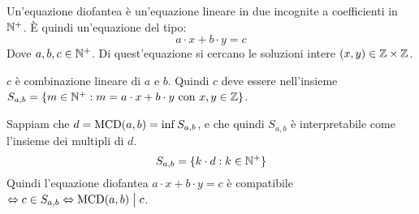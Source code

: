 \begin{defn}
Un'equazione diofantea \`e un'equazione lineare in due incognite a coefficienti in $\mathbb{N}^+$. \`E quindi un'equazione del tipo:
\[
a \cdot x + b \cdot y = c
\]
Dove $a, b, c \in \mathbb{N}^+$. Di quest'equazione si cercano le soluzioni intere $(x, y) \in \mathbb{Z} \times \mathbb{Z}$.
\end{defn}
$c$ \`e combinazione lineare di $a$ e $b$. Quindi $c$ deve essere nell'insieme $S_{a,b} = \{ m \in \mathbb{N}^+ : m = a \cdot x + b \cdot y \text{ con } x, y \in \mathbb{Z}\}$.

Sappiam che $d = \operatorname{MCD}(a,b) = \inf S_{a,b}$, e che quindi $S_{a,b}$ \`e interpretabile come l'insieme dei multipli di $d$.
\[
S_{a,b} = \{ k \cdot d : k \in \mathbb{N}^+ \}
\]
Quindi l'equazione diofantea $a \cdot x + b \cdot y = c$ \`e compatibile $\Leftrightarrow c \in S_{a,b} \Leftrightarrow \operatorname{MCD}(a,b) \bigm| c$.


